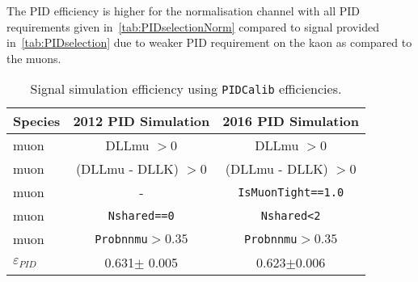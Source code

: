 The PID efficiency is higher for the normalisation channel with all PID requirements given in~\autoref{tab:PIDselectionNorm} compared to signal provided in~\autoref{tab:PIDselection} due to weaker PID requirement on the kaon as compared to the muons.

\begin{table}[H]
\begin{center}
\begin{tabular}{l c c}\toprule

    Species  & 2012 PID Simulation & 2016 PID Simulation\\ \hline
    muon &  DLLmu $ > 0$ & DLLmu $ > 0$ \\
    muon &  (DLLmu - DLLK) $ > 0$ & (DLLmu - DLLK) $ > 0$ \\
    muon &   - & \texttt{IsMuonTight==1.0}\\
    muon &  \texttt{Nshared==0} & \texttt{Nshared<2} \\
	muon &  \texttt{Probnnmu}$>0.35$ & \texttt{Probnnmu}$>0.35$ \\
     \hline
   $\varepsilon_{PID}$   & 0.631$\pm$ 0.005 & 0.623$\pm$0.006 \\

     \bottomrule
      \end{tabular}
\end{center}
\caption{Signal simulation efficiency using \texttt{PIDCalib} efficiencies.}
\label{tab:PIDselection}
\end{table}

